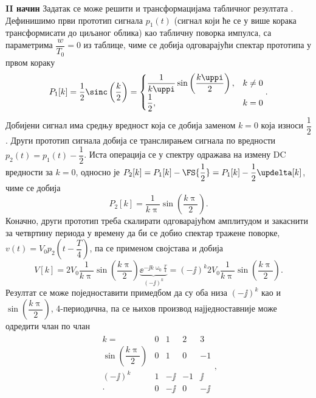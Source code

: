 \textbf{II начин} Задатак се може решити и трансформацијама табличног резултата 
.
Дефинишимо први прототип сигнала $p_1(t)$ (сигнал који ће се у више корака трансформисати 
до циљаног облика) као табличну поворка импулса, 
са параметрима $\dfrac{w}{T_0} = 0$ из таблице, чиме се добија одговарајући спектар прототипа у првом 
кораку
\begin{equation}
    P_1[k] = \dfrac{1}{2} \sinc\left(\dfrac{k}{2}\right) = 
    \begin{cases}
    \dfrac{1}{k\uppi} \sin\left(\dfrac{k\uppi}{2}\right), & k\neq 0 \\[2mm]
    \dfrac{1}{2}, & k =  0
    \end{cases}.
\end{equation}
Добијени сигнал има средњу вредност која се добија заменом $k=0$ која износи $\dfrac{1}{2}$. 
Други прототип сигнала добија се транслирањем сигнала по вредности $p_2(t) = p_1(t) - \dfrac{1}{2}$.
Иста операција се у спектру одражава на измену DC вредности за 
$k=0$, односно је $P_2[k] = P_1[k] - \FS{\dfrac{1}{2}} = P_1[k] - \dfrac{1}{2}\updelta[k]$, чиме се добија 
\begin{equation}
    P_2[k] = \dfrac{1}{k\uppi} \sin\left(\dfrac{k\uppi}{2}\right).
\end{equation}
Коначно, други прототип треба скалирати одговарајућом амплитудом
и закаснити за четвртину периода у времену да би се добио спектар тражене поворке, 
$v(t) = V_0p_2\left(t - \dfrac{T}{4}\right)$, па се применом својстава  и  добија 
\begin{equation}
V[k] = 2V_0 \dfrac{1}{k\uppi} \sin\left(\dfrac{k\uppi}{2}\right) \underbrace{\ee^{-\jj k \upomega_0 \frac{T}{4}}}_{ (-\jj)^k }
= (-\jj)^k 2V_0 \dfrac{1}{k\uppi} \sin\left(\dfrac{k\uppi}{2}\right).
\end{equation}
Резултат се може поједноставити примедбом да су оба низа $(-\jj)^k$ као и $\sin\left(\dfrac{k\uppi}{2}\right)$, 
4-периодична, па се њихов производ најједноставније може одредити члан по члан
\begin{eqnarray}
    \begin{matrix}
        k =  & 0 & 1 & 2 & 3 \\[2mm] \hline 
        \sin\left(\dfrac{k\uppi}{2}\right) & 0 & 1 & 0 & -1 \\[3mm]
        (-\jj)^k & 1 & -\jj & -1 & \jj \\ \hline
        \cdot & 0 & -\jj & 0 & -\jj \\
    \end{matrix},
\end{eqnarray}
